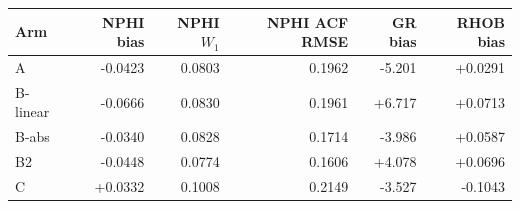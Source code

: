 \begin{tabular}{lrrrrr}
\toprule
Arm & NPHI bias & NPHI $W_1$ & NPHI ACF RMSE & GR bias & RHOB bias \\
\midrule
A & -0.0423 & 0.0803 & 0.1962 & -5.201 & +0.0291 \\
B-linear & -0.0666 & 0.0830 & 0.1961 & +6.717 & +0.0713 \\
B-abs & -0.0340 & 0.0828 & 0.1714 & -3.986 & +0.0587 \\
B2 & -0.0448 & 0.0774 & 0.1606 & +4.078 & +0.0696 \\
C & +0.0332 & 0.1008 & 0.2149 & -3.527 & -0.1043 \\
\bottomrule
\end{tabular}
